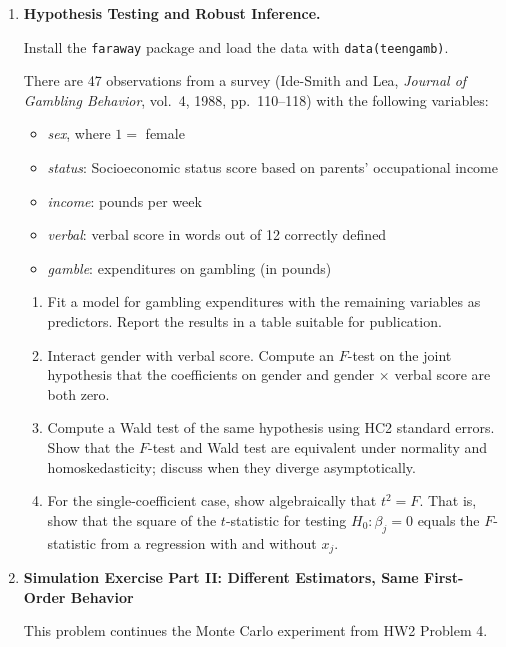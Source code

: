\documentclass{article}
\theoremstyle{definition}
\begin{document}
\begin{enumerate}
\pagebreak

\item \textbf{Hypothesis Testing and Robust Inference.}

Install the \texttt{faraway} package and load the data with \texttt{data(teengamb)}.

There are 47 observations from a survey (Ide-Smith and Lea, \emph{Journal of Gambling Behavior}, vol.\ 4, 1988, pp.\ 110--118) with the following variables:
\begin{itemize}
  \item \emph{sex}, where $1 =$ female
  \item \emph{status}: Socioeconomic status score based on parents' occupational income
    \item \emph{income}: pounds per week
  \item \emph{verbal}: verbal score in words out of 12 correctly defined
  \item \emph{gamble}: expenditures on gambling (in pounds)
\end{itemize}

\begin{enumerate}
  \item Fit a model for gambling expenditures with the remaining variables as predictors. Report the results in a table suitable for publication.

  \item Interact gender with verbal score. Compute an $F$-test on the joint hypothesis that the coefficients on gender and gender $\times$ verbal score are both zero.

  \item Compute a Wald test of the same hypothesis using HC2 standard errors. Show that the $F$-test and Wald test are equivalent under normality and homoskedasticity; discuss when they diverge asymptotically.

  \item For the single-coefficient case, show algebraically that $t^2 = F$. That is, show that the square of the $t$-statistic for testing $H_0\colon \beta_j = 0$ equals the $F$-statistic from a regression with and without $x_j$.
\end{enumerate}

\item \textbf{Simulation Exercise Part II: Different Estimators, Same First-Order Behavior}

This problem continues the Monte Carlo experiment from HW2 Problem 4.


\end{enumerate}
\end{document}
